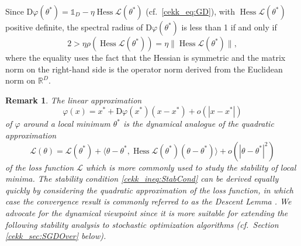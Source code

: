 \documentclass[10pt]{article}
\newtheorem{remark}[theorem]{Remark}
\begin{document}
Since $\mathrm D \varphi(\theta^*) = \mathds 1_D - \eta \operatorname{Hess} \mathcal L(\theta^*)$ (cf.~\eqref{cekk_eq:GD}), with $\operatorname{Hess} \mathcal L (\theta^*)$ positive definite, the spectral radius of $\mathrm D \varphi(\theta^*)$ is less than 1 if and only if 
\begin{equation}\label{cekk_ineq:StabCond}
	2> \eta\rho(\operatorname{Hess} \mathcal L(\theta^*)) = \eta \|\operatorname{Hess} \mathcal L(\theta^*)\|,
\end{equation}
where the equality uses the fact that the Hessian is symmetric and the matrix norm on the right-hand side is the operator norm derived from the Euclidean norm on $\mathbb R^D$.

\begin{remark}
	The linear approximation 
	$$\varphi(x) = x^* + \mathrm D \varphi(x^*) (x-x^*) + o (|x-x^*|)$$
	of $\varphi$ around a local minimum $\theta^*$ is the dynamical analogue of the quadratic approximation
	$$\mathcal L (\theta) = \mathcal L(\theta^*) + \langle\theta-\theta^*, \operatorname{Hess} \mathcal L (\theta^*) (\theta-\theta^*)\rangle + o\left(|\theta-\theta^*|^2\right)$$
	of the loss function $\mathcal L$ which is more commonly used to study the stability of local minima. The stability condition \eqref{cekk_ineq:StabCond} can be derived equally quickly by considering the quadratic approximation of the loss function, in which case the convergence result is commonly referred to as the Descent Lemma \cite[Proposition 1.2.3]{Bertsekas97}. We advocate for the dynamical viewpoint since it is more suitable for extending the following stability analysis to stochastic optimization algorithms (cf.~Section \ref{cekk_sec:SGDOver} below).
\end{remark}
\end{document}
